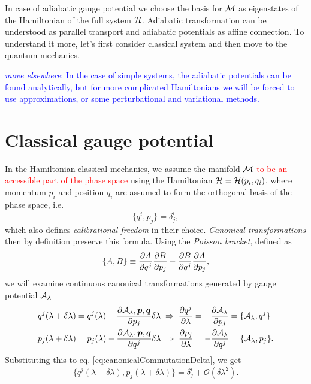 In case of adiabatic gauge potential we choose the basis for $\mathcal{M}$ as eigenstates of the Hamiltonian of the full system $\mathcal{H}$. Adiabatic transformation can be understood as parallel transport and adiabatic potentials as affine connection. To understand it more, let's first consider classical system and then move to the quantum mechanics.


\textcolor{blue}{\emph{move elsewhere}: In the case of simple systems, the adiabatic potentials can be found analytically, but for more complicated Hamiltonians we will be forced to use approximations, or some perturbational and variational methods.}




\section{Classical gauge potential}
In the Hamiltonian classical mechanics, we assume the manifold $\mathcal{M}$ \textcolor{red}{to be an accessible part of the phase space} using the Hamiltonian $\mathcal{H}=\mathcal{H}(p_i,q_i)$, where momentum $p_i$ and position $q_i$ are assumed to form the orthogonal basis of the phase space, i.e.
\begin{equation}
    \{q^i,p_j\}=\delta^i_j,
    \label{eq:canonicalCommutationDelta}
\end{equation}
which also defines \emph{calibrational freedom} in their choice. \emph{Canonical transformations} then by definition preserve this formula. Using the \emph{Poisson bracket}, defined as
\begin{equation}
    \{A,B\}\equiv \frac{\partial A}{\partial q^j}\frac{\partial B}{\partial p_j}-\frac{\partial B}{\partial q^j}\frac{\partial A}{\partial p_j},
\end{equation}
we will examine continuous canonical transformations generated by gauge potential $\mathcal{A}_\lambda$
\begin{align}
        q^j(\lambda+\delta\lambda)&=q^j(\lambda)-\frac{\partial \mathcal{A}_\lambda,\bm{p},\bm{q}}{\partial p_j}\delta\lambda \;\Rightarrow\; \frac{\partial q^j}{\partial \lambda}=-\frac{\partial \mathcal{A}_\lambda}{\partial p_j}=\{\mathcal{A}_\lambda,q^j\}
        \label{eq:gaugeAsGeneratorOfMotion1}\\
        p_j(\lambda+\delta\lambda)&=p_j(\lambda)-\frac{\partial \mathcal{A}_\lambda,\bm{p},\bm{q}}{\partial q^j}\delta\lambda \;\Rightarrow\; \frac{\partial p_j}{\partial \lambda}=-\frac{\partial \mathcal{A}_\lambda}{\partial q^j}=\{\mathcal{A}_\lambda,p_j\}.
        \label{eq:gaugeAsGeneratorOfMotion2}
\end{align}
Substituting this to eq. \ref{eq:canonicalCommutationDelta}, we get
\begin{equation}
    \{q^j(\lambda+\delta\lambda),p_j(\lambda+\delta\lambda)\}=\delta^i_j + \mathcal{O}(\delta\lambda^2).
\end{equation}
 
